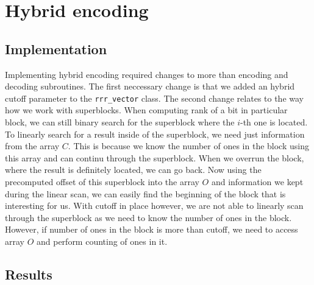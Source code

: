 \section{Hybrid encoding}

\subsection{Implementation}

Implementing hybrid encoding required changes to more than encoding and decoding
subroutines. The first neccessary change is that we added an hybrid cutoff parameter
to the \texttt{rrr\_vector} class. The second change relates to the way how we work
with superblocks. When computing rank of a bit in particular block, we can still binary
search for the superblock where the $i$-th one is located.  To linearly search for a result
inside of the superblock, we need just information from the array $C$. This is because we know
the number of ones in the block using this array and can continu through the superblock.
When we overrun the block, where the result is definitely located, we can go back.
Now using the precomputed offset of this superblock into the array $O$ and information we kept
during the linear scan, we can easily find the beginning of the block that is interesting
for us. With cutoff in place however, we are not able to linearly scan through the superblock
as we need to know the number of ones in the block. However, if number of ones in the block
is more than cutoff, we need to access array $O$ and perform counting of ones in it.

\subsection{Results}

